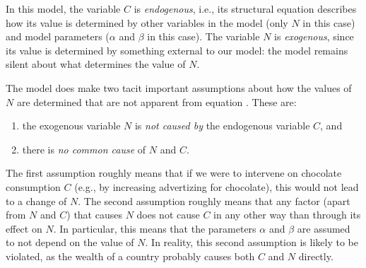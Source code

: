 \begin{enumerate}[label=(\roman*)]
    In this model, the variable $C$ is \emph{endogenous}, i.e., its structural equation  describes how its value is determined by other variables in the model (only $N$ in this case) and model parameters ($\alpha$ and $\beta$ in this case).
    The variable $N$ is \emph{exogenous}, since its value is determined by something external to our model: the model remains silent about what determines the value of $N$.

    The model does make two tacit important assumptions about how the values of $N$ are determined that are not apparent from equation . These are:
    \begin{enumerate}[label=\arabic*)]
      \item the exogenous variable $N$ is \emph{not caused by} the endogenous variable $C$, and 
      \item there is \emph{no common cause} of $N$ and $C$. 
    \end{enumerate}
    The first assumption roughly means that if we were to intervene on chocolate consumption $C$ (e.g., by increasing advertizing for chocolate), this would not lead to a change of $N$. The second assumption roughly means that any factor (apart from $N$ and $C$) that causes $N$ does not cause $C$ in any other way than through its effect on $N$. In particular, this means that the parameters $\alpha$ and $\beta$ are assumed to not depend on the value of $N$. In reality, this second assumption is likely to be violated, as the wealth of a country probably causes both $C$ and $N$ directly.


\end{enumerate}
